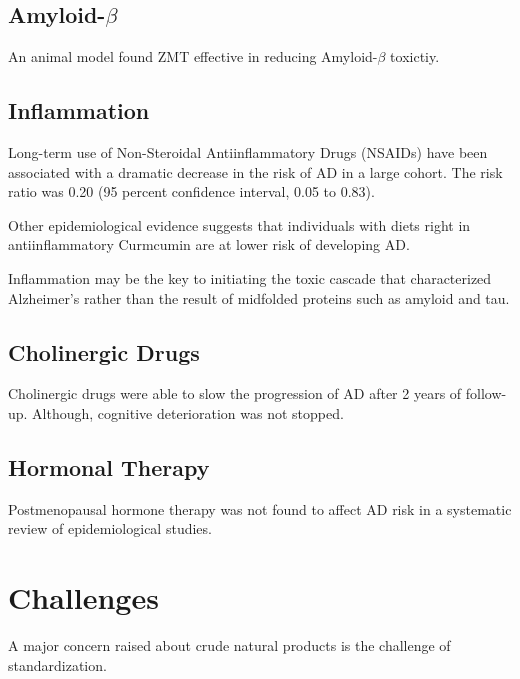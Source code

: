 \documentclass[twocolumn]{article}
\begin{document}
\subsection{Amyloid-$\beta$}


An animal model found ZMT effective in reducing Amyloid-$\beta$
toxictiy.
\cite{tohda2003repair}


\subsection{Inflammation}


Long-term use of Non-Steroidal Antiinflammatory Drugs (NSAIDs)
have been associated with a dramatic decrease in the risk of AD
in a large cohort.
The risk ratio was 0.20 (95 percent confidence interval, 0.05 to 0.83).
\cite{in2001nonsteroidal}

Other epidemiological evidence suggests that individuals
with diets right in antiinflammatory Curmcumin
are at lower risk of developing AD.
\cite{?}


Inflammation may be the key to initiating the toxic cascade that
characterized Alzheimer's rather than the result of
midfolded proteins such as amyloid and tau.
\cite{heneka2007inflammatory}







\subsection{Cholinergic Drugs}

Cholinergic drugs were able to slow the progression of AD
after 2 years of follow-up.
Although, cognitive deterioration was not stopped.
\cite{requena2006effects}




\subsection{Hormonal Therapy}
Postmenopausal hormone therapy was not found
to affect AD risk in a systematic review of
epidemiological studies.
\cite{o2014postmenopausal}



\section{Challenges}

A major concern raised about crude natural products is
the challenge of standardization.
\end{document}
